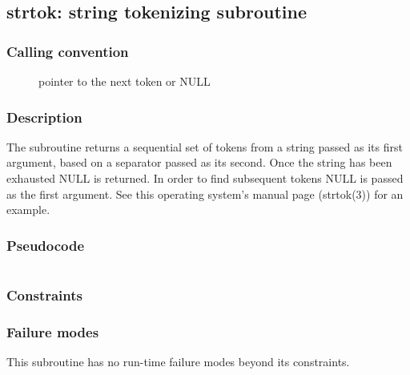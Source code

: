 \clearpage
{}
{}
\label{subr:strtok}
\subsection*{strtok: string tokenizing subroutine}

\subsubsection*{Calling convention}

\begin{description}
\item[] pointer to the next token or NULL
\end{description}

\subsubsection*{Description}

The  subroutine returns a sequential set of tokens
from a string passed as its first argument, based on a separator
passed as its second.  Once the string has been exhausted NULL is
returned.  In order to find subsequent tokens NULL is passed as the
first argument.  See this operating system's 
manual page (strtok(3)) for an example.

\subsubsection*{Pseudocode}

\begin{verbatim}
\end{verbatim}

\subsubsection*{Constraints}

\subsubsection*{Failure modes}

This subroutine has no run-time failure modes beyond its constraints.
